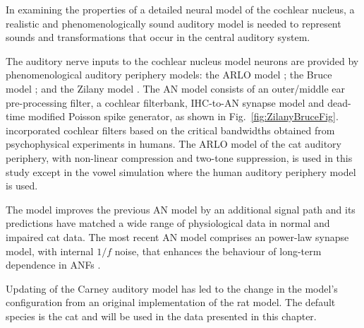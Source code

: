In examining the properties of a detailed neural model of the cochlear
nucleus, a realistic and phenomenologically sound auditory model is
needed to represent sounds and transformations that occur in the
central auditory system.



The auditory nerve inputs to the cochlear nucleus model neurons are
provided by phenomenological auditory periphery models: the ARLO model
\citep{HeinzZhangEtAl:2001}; the Bruce model
\citep{BruceSachsEtAl:2003,ZilanyBruce:2006,ZilanyBruce:2007}; and the
Zilany model \citep{ZilanyBruceEtAl:2009}. The AN model consists of
an outer/middle ear pre-processing filter, a cochlear filterbank,
IHC-to-AN synapse model and dead-time modified Poisson spike
generator, as shown in Fig.~\ref{fig:ZilanyBruceFig}. \citep{HeinzZhangEtAl:2001} incorporated cochlear filters
based on the critical bandwidths obtained from psycho\-physical
experiments in humans. The ARLO model of the cat auditory periphery,
with non-linear compression and two-tone suppression, is used in this
study except in the vowel simulation where the human auditory
periphery model is used.

\medskip{}

The \citet{ZilanyBruce:2007} model improves the previous AN model by an additional signal
path and its predictions have matched a wide range of physiological
data in normal and impaired cat data. The most recent AN model
comprises an power-law synapse model, with internal $1/f$
noise, that enhances the behaviour of long-term dependence in ANFs
\citep{ZilanyBruceEtAl:2009}.

\medskip{}

 Updating of the Carney auditory model has led to the
change in the model's configuration from an original implementation of
the rat model.  The default species is the cat and will be used in the
data presented in this chapter.

